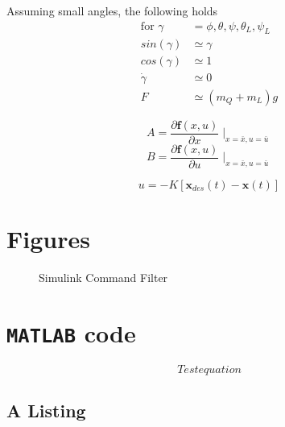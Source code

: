 Assuming small angles, the following holds
\begin{align}\label{key}
\text{for } \gamma &= \phi, \theta, \psi, \theta_L, \psi_L\\
sin(\gamma)&\simeq \gamma\\
cos(\gamma)&\simeq 1\\
\dot{\gamma} &\simeq 0\\
F &\simeq (m_Q+m_L)g
\end{align}

\begin{equation}\label{key}
A=\frac{\partial \textbf{f}(x,u)}{\partial x}\mid _{	x=\bar{x},u=\bar{u}	}
\end{equation}
\begin{equation}\label{key}
B=\frac{\partial \textbf{f}(x,u)}{\partial u}\mid _{	x=\bar{x},u=\bar{u}	}
\end{equation}

\begin{equation}\label{key}
u=-K\left[\textbf{x}_{des}(t)-\textbf{x}(t)\right] 
\end{equation}


\section{Figures}
\begin{figure}[h!]
	\centering
	\caption{Simulink Command Filter\label{fig:app.CF}}
\end{figure}		

\section{\texttt{MATLAB} code}
\begin{equation}\label{key}
Test equation
\end{equation}
\subsection{A \matlab Listing}

\lstset{language=matlab}


%
%        

%
%

